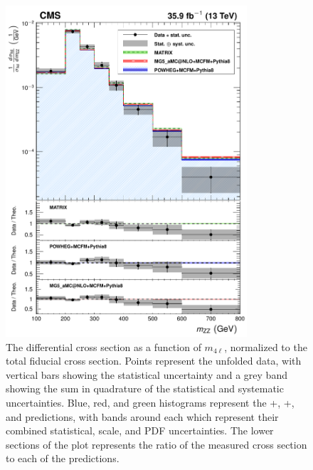 \begin{figure}[htbp]
  \begin{center}
    \includegraphics[width=0.8\textwidth]{results/unfold_mass.pdf}
    \caption[Normalized differential {\ZZ} cross section as a function of four-lepton invariant mass]{
        The {\ZZ} differential cross section as a function of $m_{4\ell}$, normalized to the total fiducial cross section.
        Points represent the unfolded data, with vertical bars showing the statistical uncertainty and a grey band showing the sum in quadrature of the statistical and systematic uncertainties.
        Blue, red, and green histograms represent the {\POWHEG}+{\MCFM}, {\MGAMC}+{\MCFM}, and {\MATRIX} predictions, with bands around each which represent their combined statistical, scale, and PDF uncertainties.
        The lower sections of the plot represents the ratio of the measured cross section to each of the predictions.
      }\label{fig:unfold_mass}
  \end{center}
\end{figure}

